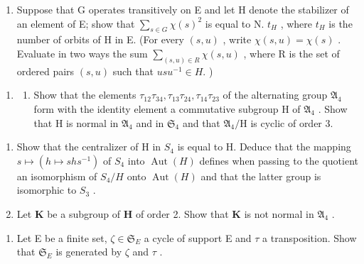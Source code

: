 \begin{enumerate}
\def\labelenumi{(\alph{enumi})}
\setcounter{enumi}{2}
\tightlist
\item
  Suppose that G operates transitively on E and let H denote the stabilizer of an element of E; show that \(\sum_{s\in G}\chi(s)^{2}\) is equal to N. \(t_{H}\) , where \(t_{H}\) is the number of orbits of H in E. (For every \((s,u)\) , write \(\chi(s,u)=\chi(s)\) . Evaluate in two ways the sum \(\sum_{(s,u)\in R}\chi(s,u)\) , where R is the set of ordered pairs \((s,u)\) such that \(usu^{-1}\in H.\) )
\end{enumerate}

\begin{enumerate}
\def\labelenumi{\arabic{enumi}.}
\setcounter{enumi}{9}
\tightlist
\item
  \begin{enumerate}
  \def\labelenumii{(\alph{enumii})}
  \tightlist
  \item
    Show that the elements \(\tau_{12}\tau_{34},\tau_{13}\tau_{24},\tau_{14}\tau_{23}\) of the alternating group \(\mathfrak{A}_4\) form with the identity element a commutative subgroup H of \(\mathfrak{A}_4\) . Show that H is normal in \(\mathfrak{A}_4\) and in \(\mathfrak{S}_4\) and that \(\mathfrak{A}_4 / \mathrm{H}\) is cyclic of order 3.
  \end{enumerate}
\end{enumerate}

\begin{enumerate}
\def\labelenumi{(\alph{enumi})}
\setcounter{enumi}{1}
\item
  Show that the centralizer of H in \(S_{4}\) is equal to H. Deduce that the mapping \(s \mapsto (h \mapsto shs^{-1})\) of \(S_{4}\) into \(\operatorname{Aut}(H)\) defines when passing to the quotient an isomorphism of \(S_{4}/H\) onto \(\operatorname{Aut}(H)\) and that the latter group is isomorphic to \(S_{3}\) .
\item
  Let \(\mathbf{K}\) be a subgroup of \(\mathbf{H}\) of order 2. Show that \(\mathbf{K}\) is not normal in \(\mathfrak{A}_4\) .
\end{enumerate}

\begin{enumerate}
\def\labelenumi{\arabic{enumi}.}
\setcounter{enumi}{10}
\tightlist
\item
  Let E be a finite set, \(\zeta \in \mathfrak{S}_{E}\) a cycle of support E and \(\tau\) a transposition. Show that \(\mathfrak{S}_{E}\) is generated by \(\zeta\) and \(\tau\) .
\end{enumerate}

